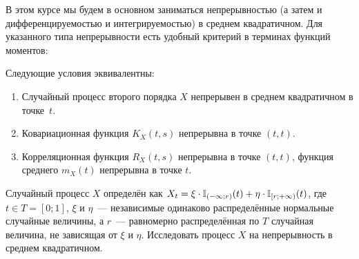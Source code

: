 В этом курсе мы будем в основном заниматься непрерывностью
(а затем и дифференцируемостью и интегрируемостью) в среднем квадратичном.
Для указанного типа непрерывности есть удобный критерий в терминах функций моментов:

\begin{theorem}
    \label{theorem:calculus:mean_squares_continuity_test}
    Следующие условия эквивалентны:
    \begin{enumerate}
        \item
            Случайный процесс второго порядка $ X $ непрерывен в среднем квадратичном в точке~$ t $.
        \item
            Ковариационная функция $ K_X(t, s) $ непрерывна в точке $ (t, t) $. %
        \item
            Корреляционная функция $ R_X(t, s) $ непрерывна в точке $ (t,t) $, %
            функция среднего $ m_X(t) $ непрерывна в точке $ t $.
    \end{enumerate}
\end{theorem}

\begin{exercise}
    \label{exercise:calculus:continuous_step_process}
    Случайный процесс $ X $ определён как $ X_t = \xi \cdot \mathbb{I}_{(-\infty;r)}(t) + \eta \cdot \mathbb{I}_{[r;+\infty)}(t) $,
    где $ t \in T = [0;1] $, $ \xi $ и $ \eta $~--- независимые одинаково распределённые нормальные случайные величины,
    а $ r $~--- равномерно распределённая по $ T $ случайная величина, не зависящая от $ \xi $ и $ \eta $.
    Исследовать процесс $ X $ на непрерывность в среднем квадратичном.
\end{exercise}

